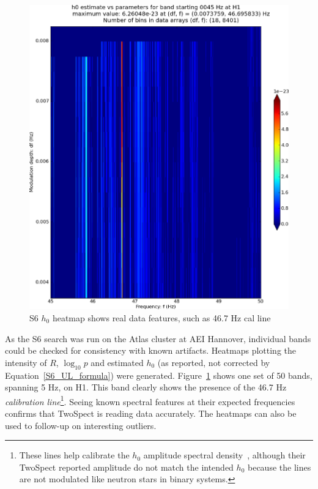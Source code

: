 \begin{figure}
\begin{center}
\includegraphics[width=0.68\paperwidth,height=0.48\paperheight]{plots/DFvsFresultsh0-H1_pulsar-0045.eps}
\caption{
S6 $h_0$ heatmap shows real data features, such as 46.7 Hz cal line}
\label{S6_cal_line_heatmap}
\end{center}
\end{figure}

As the S6 search was run on the Atlas cluster at AEI Hannover, individual bands could be checked for consistency with known artifacts.
Heatmaps plotting the intensity of $R$, $\log_{10}p$ and estimated $h_0$ (as reported, not corrected by Equation~\ref{S6_UL_formula}) were generated.
Figure~\ref{S6_cal_line_heatmap} shows one set of 50 bands, spanning 5 Hz, on H1.
This band clearly shows the presence of the 46.7 Hz \textit{calibration line}\footnote{These lines help calibrate the $h_0$ amplitude spectral density~\cite{MeadorsFeedforward2014}, although their TwoSpect reported amplitude do not match the intended $h_0$ because the lines are not modulated like neutron stars in binary systems.}.
Seeing known spectral features at their expected frequencies confirms that TwoSpect is reading data accurately. 
The heatmaps can also be used to follow-up on interesting outliers.

